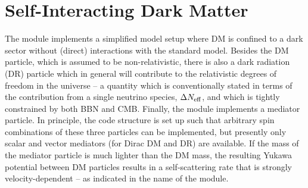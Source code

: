 \chapter{Self-Interacting Dark Matter}
\label{ch:vdSIDM}

The  module implements a simplified model setup where DM is confined to a dark sector
without (direct) interactions with the standard model. Besides the DM particle, which is assumed to be non-relativistic,
there is also a dark radiation (DR) particle which in general will contribute to the relativistic degrees of freedom
in the universe -- a quantity which is conventionally stated in terms of the contribution from a single neutrino
species, $\Delta N_{\rm eff}$, and which is tightly constrained by both BBN and CMB. 
Finally, the module implements a mediator particle. In principle, the code structure is set up such that arbitrary 
spin combinations of these three particles can be implemented, but presently only scalar and vector mediators
(for Dirac DM and DR) are available.  If the mass of the mediator particle is much lighter than the DM mass,
the resulting Yukawa potential between DM particles results in a self-scattering rate that is strongly velocity-dependent
-- as indicated in the name of the module.

 